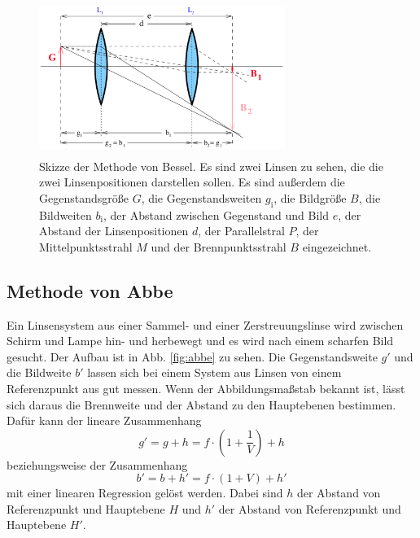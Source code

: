 \begin{figure}
    \centering
    \includegraphics[width=8cm, height=5cm]{build/bessel.png}
    \caption{Skizze der Methode von Bessel. Es sind zwei Linsen zu sehen, die die zwei Linsenpositionen darstellen sollen. Es sind außerdem die Gegenstandsgröße $G$, die Gegenstandsweiten $g_\text{i}$, die Bildgröße $B$, die Bildweiten $b_\text{i}$, der Abstand zwischen Gegenstand und Bild $e$, der Abstand der Linsenpositionen $d$, der Parallelstral $P$, der Mittelpunktsstrahl $M$ und der Brennpunktsstrahl $B$ eingezeichnet. \cite{V408}}
    \label{fig:bessel}
\end{figure}

\subsection{Methode von Abbe}
Ein Linsensystem aus einer Sammel- und einer Zerstreuungslinse wird zwischen Schirm und Lampe hin- und herbewegt und es wird nach einem scharfen Bild gesucht. Der Aufbau ist in Abb. \ref{fig:abbe} zu sehen.
Die Gegenstandsweite $g'$ und die Bildweite $b'$ lassen sich bei einem System aus Linsen von einem Referenzpunkt aus gut messen. 
Wenn der Abbildungsmaßstab bekannt ist, lässt sich daraus die Brennweite und der Abstand zu den Hauptebenen bestimmen. 
Dafür kann der lineare Zusammenhang 
\begin{equation}
    g' = g + h = f \cdot \left(1 + \frac{1}{V} \right) + h
    \label{eqn:gstrich}
\end{equation}
beziehungsweise der Zusammenhang 
\begin{equation}
    b' = b + h' = f \cdot \left(1 + V \right) + h'
    \label{eqn:bstrich}
\end{equation}
mit einer linearen Regression gelöst werden. 
Dabei sind $h$ der Abstand von Referenzpunkt und Hauptebene $H$ und $h'$ der Abstand von Referenzpunkt und Hauptebene $H'$.

